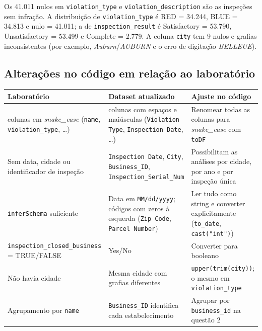 \documentclass[11pt,a4paper]{article}
\newcommand{\col}[1]{\texttt{#1}}
\begin{document}
Os 41.011 nulos em \col{violation\_type} e \col{violation\_description} são as inspeções sem infração. A distribuição de \col{violation\_type} é RED = 34.244, BLUE = 34.813 e nulo = 41.011; a de \col{inspection\_result} é Satisfactory = 53.790, Unsatisfactory = 53.499 e Complete = 2.779. A coluna \col{city} tem 9 nulos e grafias inconsistentes (por exemplo, \textit{Auburn}/\textit{AUBURN} e o erro de digitação \textit{BELLEUE}).

\subsection*{Alterações no código em relação ao laboratório}

\begin{table}[H]
\centering
\small
\begin{tabular}{>{\raggedright\arraybackslash}p{4.3cm}>{\raggedright\arraybackslash}p{5.2cm}>{\raggedright\arraybackslash}p{5.8cm}}
\toprule
Laboratório & Dataset atualizado & Ajuste no código \\
\midrule
\addlinespace
5 colunas em \textit{snake\_case} (\col{name}, \col{violation\_type}, \ldots) & 20 colunas com espaços e maiúsculas (\col{Violation Type}, \col{Inspection Date}, \ldots) & Renomear todas as colunas para \textit{snake\_case} com \col{toDF} \\
Sem data, cidade ou identificador de inspeção & \col{Inspection Date}, \col{City}, \col{Business\_ID}, \col{Inspection\_Serial\_Num} & Possibilitam as análises por cidade, por ano e por inspeção única \\
\col{inferSchema} suficiente & Data em \col{MM/dd/yyyy}; códigos com zeros à esquerda (\col{Zip Code}, \col{Parcel Number}) & Ler tudo como string e converter explicitamente (\col{to\_date}, \col{cast("int")}) \\
\col{inspection\_closed\_}\-\col{business} = TRUE/FALSE & Yes/No & Converter para booleano \\
Não havia cidade & Mesma cidade com grafias diferentes & \col{upper(trim(city))}; o mesmo em \col{violation\_type} \\
Agrupamento por \col{name} & \col{Business\_ID} identifica cada estabelecimento & Agrupar por \col{business\_id} na questão 2 \\
\bottomrule
\end{tabular}
\end{table}
\end{document}
